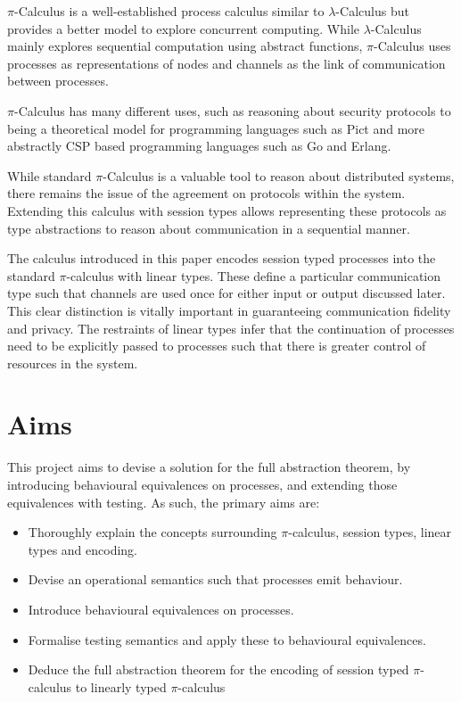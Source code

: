 $\pi$-Calculus is a well-established process calculus similar to $\lambda$-Calculus but provides a better model to explore concurrent computing. While $\lambda$-Calculus mainly explores sequential computation using abstract functions, $\pi$-Calculus uses processes as representations of nodes and channels as the link of communication between processes.

$\pi$-Calculus has many different uses, such as reasoning about security protocols \cite{ryan2011applied} to being a theoretical model for programming languages such as Pict \cite{DBLP:conf/tppp/Pierce94} and more abstractly CSP based programming languages such as Go and Erlang.

While standard $\pi$-Calculus is a valuable tool to reason about distributed systems, there remains the issue of the agreement on protocols within the system. Extending this calculus with session types allows representing these protocols as type abstractions to reason about communication in a sequential manner. 

The calculus introduced in this paper encodes session typed processes into the standard $\pi$-calculus with linear types. These define a particular communication type such that channels are used once for either input or output discussed later. This clear distinction is vitally important in guaranteeing communication fidelity and privacy. The restraints of linear types infer that the continuation of processes need to be explicitly passed to processes such that there is greater control of resources in the system.

\section{Aims}

This project aims to devise a solution for the full abstraction theorem, by introducing behavioural equivalences on processes, and extending those equivalences with testing. As such, the primary aims are:

\begin{itemize}
    \item Thoroughly explain the concepts surrounding $\pi$-calculus, session types, linear types and encoding.
    \item Devise an operational semantics such that processes emit behaviour.
    \item Introduce behavioural equivalences on processes.
    \item Formalise testing semantics and apply these to behavioural equivalences.
    \item Deduce the full abstraction theorem for the encoding of session typed $\pi$-calculus to linearly typed $\pi$-calculus 
\end{itemize}

